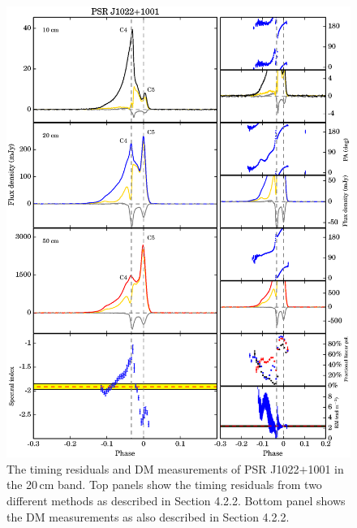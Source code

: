 \documentclass[useAMS,usenatbib]{mn2e}
\begin{document}
\begin{appendix}
\begin{figure}
\includegraphics[width=6 in]{1022.ps}
\caption{The timing residuals and DM measurements of PSR J1022$+$1001 in the 20\,cm band. 
Top panels show the timing residuals from two different methods as described in Section 4.2.2.
Bottom panel shows the DM measurements as also described in Section 4.2.2.
}
\label{1022resi}
\end{figure}
%
\begin{figure}
\center

\end{figure}
\end{appendix}
\end{document}
